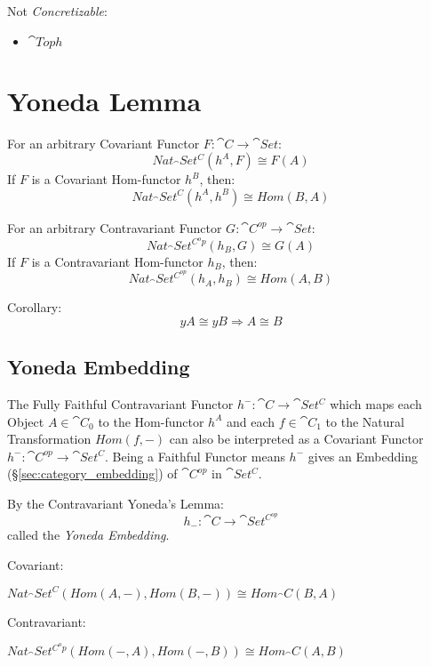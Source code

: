 Not \emph{Concretizable}:
\begin{itemize}
  \item $\cat{Toph}$
\end{itemize}



\section{Yoneda Lemma}\label{sec:yoneda_lemma}

For an arbitrary Covariant Functor $F : \cat{C} \rightarrow
\cat{Set}$:
\[
  Nat_\cat{Set^C}(h^A,F) \cong F(A)
\]
If $F$ is a Covariant Hom-functor $h^B$, then:
\[
  Nat_\cat{Set^C}(h^A,h^B) \cong Hom(B,A)
\]

For an arbitrary Contravariant Functor $G : \cat{C}^{op} \rightarrow
\cat{Set}$:
\[
  Nat_\cat{Set^{C^op}}(h_B,G) \cong G(A)
\]
If $F$ is a Contravariant Hom-functor $h_B$, then:
\[
  Nat_\cat{Set^{C^{op}}}(h_A,h_B) \cong Hom(A,B)
\]

Corollary:
\[
  yA \cong yB \Rightarrow A \cong B
\]



\subsection{Yoneda Embedding}\label{sec:yoneda_embedding}

The Fully Faithful Contravariant Functor $h^- : \cat{C} \rightarrow
\cat{Set^C}$ which maps each Object $A \in \cat{C}_0$ to the
Hom-functor $h^A$ and each $f \in \cat{C}_1$ to the Natural
Transformation $Hom(f,-)$ can also be interpreted as a Covariant
Functor $h^- : \cat{C^{op}} \rightarrow \cat{Set^C}$. Being a
Faithful Functor means $h^-$ gives an Embedding
(\S\ref{sec:category_embedding}) of $\cat{C^{op}}$ in
$\cat{Set^C}$.

By the Contravariant Yoneda's Lemma:
\[
  h_-: \cat{C} \rightarrow \cat{Set^{C^{op}}}
\]
called the \emph{Yoneda Embedding}.

Covariant:

$Nat_\cat{Set^C}(Hom(A,-), Hom(B,-)) \cong Hom_\cat{C}(B,A)$

Contravariant:

$Nat_\cat{Set^{C^op}}(Hom(-,A), Hom(-,B)) \cong Hom_\cat{C}(A,B)$


